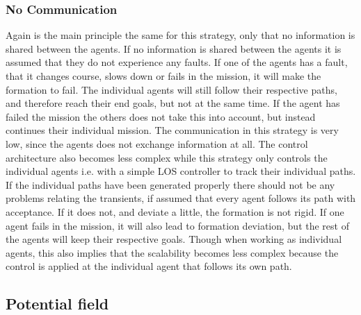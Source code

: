\subsubsection{No Communication}
Again is the main principle the same for this strategy, only that no information is shared between the agents. If no information is shared between the agents it is assumed that they do not experience any faults. If one of the agents has a fault, that it changes course, slows down or fails in the mission, it will make the formation to fail. The individual agents will still follow their respective paths, and therefore reach their end goals, but not at the same time. If the agent has failed the mission the others does not take this into account, but instead continues their individual mission. The communication in this strategy is very low, since the agents does not exchange information at all. The control architecture also becomes less complex while this strategy only controls the individual agents i.e. with a simple \ac{LOS} controller to track their individual paths. If the individual paths have been generated properly there should not be any problems relating the transients, if assumed that every agent follows its path with acceptance. If it does not, and deviate a little, the formation is not rigid. If one agent fails in the mission, it will also lead to formation deviation, but the rest of the agents will keep their respective goals. Though when working as individual agents, this also implies that the scalability becomes less complex because the control is applied at the individual agent that follows its own path.

\subsection{Potential field}
